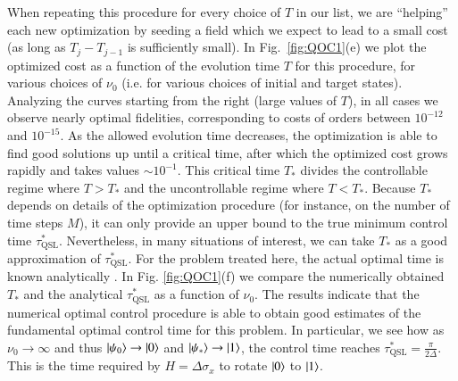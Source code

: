 When repeating this procedure for every choice of $T$ in our list, we are ``helping'' each new optimization by seeding a field which we expect to lead to a small cost (as long as $T_j-T_{j-1}$ is sufficiently small). In Fig.~\ref{fig:QOC1}(e)  we plot the optimized cost as a function of the evolution time $T$ for this procedure, for various choices of $\nu_0$ (i.e. for various choices of initial and target states). Analyzing the curves starting from the right (large values of $T$), in all cases we observe nearly optimal fidelities, corresponding to costs of orders between $10^{-12}$ and $10^{-15}$. As the allowed evolution time decreases, the optimization is able to find good solutions up until a critical time, after which the optimized cost grows rapidly and takes values $\sim 10^{-1}$. This critical time $T_*$ divides the controllable regime where $T>T_*$ and the uncontrollable regime where $T<T_*$. Because $T_*$ depends on details of the optimization procedure (for instance, on the number of time steps $M$), it can only provide  an upper bound to the true minimum control time $\tau_{\text{QSL}}^\ast$. Nevertheless, in many situations of interest, we can take $T_*$ as a good approximation of $\tau_{\text{QSL}}^\ast$. For the problem treated here, the actual optimal time is known analytically \cite{hegerfeldt2013,poggi2013}. In Fig. \ref{fig:QOC1}(f) we compare the numerically obtained $T_*$ and the analytical $\tau_{\text{QSL}}^\ast$ as a function of $\nu_0$. The results indicate that the numerical optimal control procedure is able to obtain good estimates of the fundamental optimal control time for this problem. In particular, we see how as $\nu_0\rightarrow \infty$ and thus $\ket{\psi_0}\rightarrow \ket{0}$ and $\ket{\psi_\ast}\rightarrow\ket{1}$, the control time reaches $\tau_{\mathrm{QSL}}^\ast=\frac{\pi}{2\Delta}$. This is the time required by $H=\Delta \sigma_x$ to rotate $\ket{0}$ to $\ket{1}$. 

